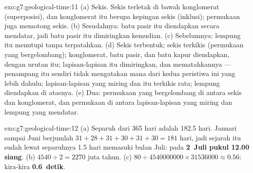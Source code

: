 \begin{solution}{exo:g7:geological-time:11}
(a) Sekis. Sekis terletak di bawah konglomerat (superposisi), dan 
konglomerat itu berupa kepingan sekis (inklusi); permukaan  juga
memotong sekis. (b) Sesudahnya: batu pasir itu diendapkan secara mendatar,
jadi batu pasir itu dimiringkan kemudian. (c) Sebelumnya: lempung itu
menutupi  tanpa terpatahkan. (d) Sekis terbentuk; sekis terkikis
(permukaan yang bergelombang); konglomerat, batu pasir, dan batu kapur
diendapkan, dengan urutan itu; lapisan-lapisan itu dimiringkan, dan 
mematahkannya --- penampang itu sendiri tidak mengatakan mana dari kedua
peristiwa ini yang lebih dahulu; lapisan-lapisan yang miring dan  itu
terkikis rata; lempung diendapkan di atasnya. (e) Dua: permukaan yang
bergelombang di antara sekis dan konglomerat, dan permukaan di antara
lapisan-lapisan yang miring dan lempung yang mendatar.
\end{solution}

\begin{solution}{exo:g7:geological-time:12}
(a) Separuh dari 365 hari adalah 182.5 hari. Januari sampai Juni berjumlah
$31+28+31+30+31+30 = 181$ hari, jadi sejarah itu sudah lewat separuhnya
1.5 hari memasuki bulan Juli: pada \textbf{2~Juli pukul 12.00 siang}.
(b) $4540 \div 2 = 2270$ juta tahun. (c) $80 \div \num{4540000000} \times \num{31536000} \approx 0.56$:
kira-kira \textbf{0.6~detik}.
\end{solution}

